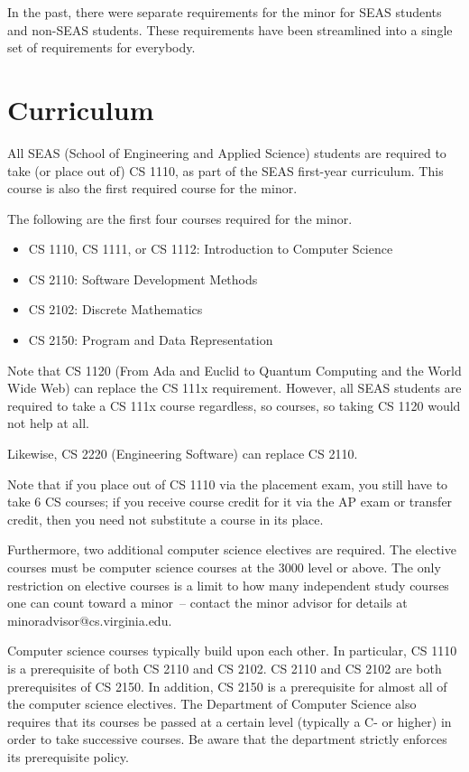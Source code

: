 \documentclass[10pt,letter]{book}
\makeatletter
\newenvironment{itemlist}{
\begin{itemize}
\setlength{\itemsep}{0pt}
\setlength{\parskip}{0pt}}
{\end{itemize}}
\newcommand{\csminoradvisoremail}{minoradvisor@cs.virginia.edu}
\newcommand{\mysection}[1]{\section{#1}\renewcommand{\rightmark}{#1}}
\makeatother
\begin{document}
In the past, there were separate requirements for the minor for SEAS
students and non-SEAS students.  These requirements have been
streamlined into a single set of requirements for everybody.
 
\mysection{Curriculum}

All SEAS (School of Engineering and Applied Science) students are
required to take (or place out of) CS 1110, as part of the SEAS
first-year curriculum. This course is also the first required course
for the minor.

The following are the first four courses required for the minor.

\begin{itemlist} 
\item CS 1110, CS 1111, or CS 1112: Introduction
  to Computer Science
\item CS 2110: Software Development Methods
\item CS 2102: Discrete Mathematics
\item CS 2150: Program and Data Representation
\end{itemlist}

Note that CS 1120 (From Ada and Euclid to Quantum Computing and the
World Wide Web) can replace the CS 111x requirement.  However, all
SEAS students are required to take a CS 111x course regardless, so
courses, so taking CS 1120 would not help at all.

Likewise, CS 2220 (Engineering Software) can replace CS 2110.

Note that if you place out of CS 1110 via the placement exam,
you still have to take 6 CS courses; if you receive course credit for
it via the AP exam or transfer credit, then you need not substitute a
course in its place.

Furthermore, two additional computer science electives are
required. The elective courses must be computer science courses at the
3000 level or above. The only restriction on elective courses is a
limit to how many independent study courses one can count toward a
minor~-- contact the minor advisor for details at
\csminoradvisoremail.

Computer science courses typically build upon each other. In
particular, CS 1110 is a prerequisite of both CS 2110 and
CS 2102. CS 2110 and CS 2102 are both prerequisites
of CS 2150. In addition, CS 2150 is a prerequisite for
almost all of the computer science electives. The Department of
Computer Science also requires that its courses be passed at a certain
level (typically a C- or higher) in order to take successive
courses. Be aware that the department strictly enforces its
prerequisite policy.
\end{document}
